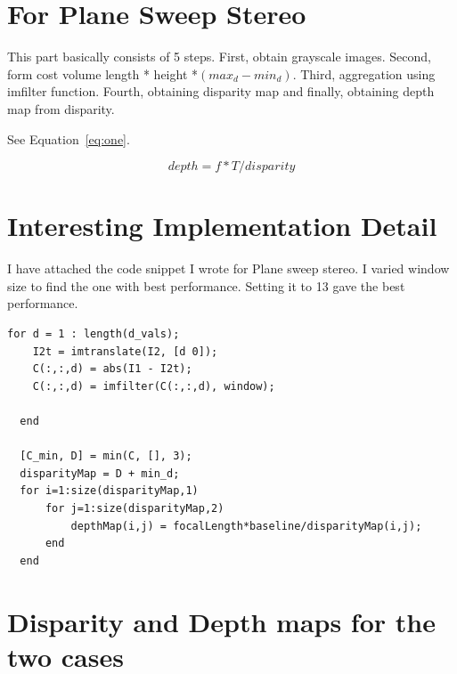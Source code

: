 \section{For Plane Sweep Stereo}

This part basically consists of 5 steps. First, obtain grayscale images. Second, form cost volume length * height *$ (max_d - min_d)$. Third, aggregation using imfilter function. Fourth, obtaining disparity map and finally, obtaining depth map from disparity.

See Equation~\ref{eq:one}.

\begin{equation}
depth = f*T/disparity
\label{eq:one}
\end{equation}


\section*{Interesting Implementation Detail}

I have attached the code snippet I wrote for Plane sweep stereo. I varied window size to find the one with best performance. Setting it to 13 gave the best performance.

\begin{lstlisting}[style=Matlab-editor]
  for d = 1 : length(d_vals);
    I2t = imtranslate(I2, [d 0]);
    C(:,:,d) = abs(I1 - I2t); 
    C(:,:,d) = imfilter(C(:,:,d), window);

  end

  [C_min, D] = min(C, [], 3);
  disparityMap = D + min_d;
  for i=1:size(disparityMap,1)
      for j=1:size(disparityMap,2)
          depthMap(i,j) = focalLength*baseline/disparityMap(i,j);
      end
  end
\end{lstlisting}

\section{Disparity and Depth maps for the two cases}

